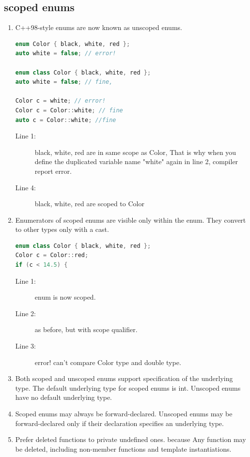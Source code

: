 \documentclass[a4paper,11pt,twoside]{book}
\begin{document}
\subsection{scoped enums}
\begin{enumerate}
\item C++98-style enums are now known as unscoped enums.
\begin{lstlisting}[frame=single, language=c++]
enum Color { black, white, red };
auto white = false; // error! 

enum class Color { black, white, red };
auto white = false; // fine, 

Color c = white; // error!
Color c = Color::white; // fine
auto c = Color::white; //fine
\end{lstlisting}
\begin{description}
	\item[Line 1:] black, white, red are in same scope as Color, That is why when you define the duplicated variable name "white" again in line 2, compiler report error.
	
	\item[Line 4:]black, white, red are scoped to Color
\end{description}

\item Enumerators of scoped enums are visible only within the enum. They convert
to other types only with a cast.
\begin{lstlisting}[frame=single, language=c++]
enum class Color { black, white, red }; 
Color c = Color::red; 
if (c < 14.5) { 
\end{lstlisting}
\begin{description}
	\item[Line 1:] enum is now scoped.
	\item[Line 2:] as before, but with scope qualifier.
	\item[Line 3:] error! can't compare Color type and double type.
\end{description}
\item Both scoped and unscoped enums support specification of the underlying type.
The default underlying type for scoped enums is int. Unscoped enums have no
default underlying type.

\item Scoped enums may always be forward-declared. Unscoped enums may be
forward-declared only if their declaration specifies an underlying type.

\item Prefer deleted functions to private undefined ones. because Any function may be deleted, including non-member functions and template instantiations.
\end{enumerate}
\end{document}
